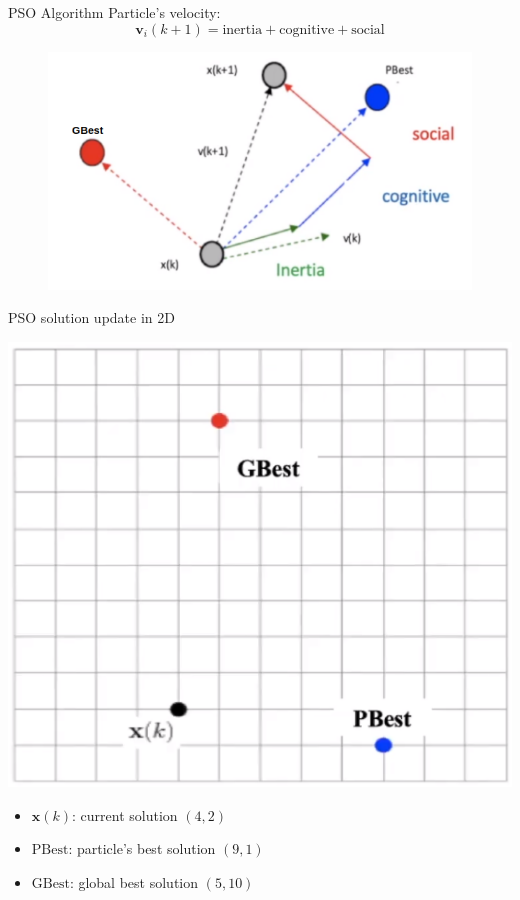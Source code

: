 \documentclass[pdflatex,compress,mathserif]{beamer}
\begin{document}
\begin{frame}{PSO Algorithm}
	Particle's velocity: $$\mathbf{v}_i (k+1) = \text{inertia} + \text{cognitive} + \text{social}$$
	\begin{figure}
		\centering
		\includegraphics[width=0.7\linewidth]{img/09}
	\end{figure}
\end{frame}

\begin{frame}{PSO solution update in 2D}
	\begin{multicols}{2}
		\includegraphics[width=\linewidth]{img/10}
		\vfill\null
		\columnbreak
		\begin{itemize}
			\item[] \scriptsize{$\mathbf{x}(k)$: current solution $(4,2)$}
			\item[] \scriptsize{$\text{PBest}$: particle's best solution $(9,1)$}
			\item[] \scriptsize{$\text{GBest}$: global best solution $(5,10)$}
		\end{itemize}
		\vfill\null
	\end{multicols}
\end{frame}
\end{document}
